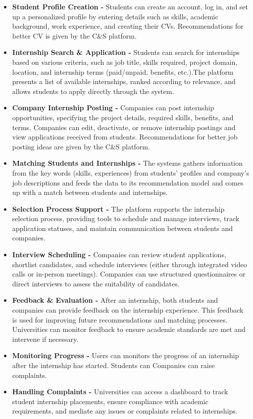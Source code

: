\begin{itemize}
    \item \textbf{Student Profile Creation - } Students can create an account, log in, and set up a personalized profile by entering details such as skills, academic background, work experience, and creating their CVs. Recommendations for better CV is given by the C\&S platform.
    \item \textbf{Internship Search \& Application - } Students can search for internships based on various criteria, such as job title, skills required, project domain, location, and internship terms (paid/unpaid, benefits, etc.).The platform presents a list of available internships, ranked according to relevance, and allows students to apply directly through the system.
    \item \textbf{Company Internship Posting - } Companies can post internship opportunities, specifying the project details, required skills, benefits, and terms. Companies can edit, deactivate, or remove internship postings and view applications received from students. Recommendations for better job posting ideas are given by the C\&S platform.
    \item \textbf{Matching Students and Internships - } The systems gathers information from the key words (skills, experiences) from students' profiles and company's job descriptions and feeds the data to its recommendation model and comes up with a match between students and internships. 
    \item \textbf{Selection Process Support - } The platform supports the internship selection process, providing tools to schedule and manage interviews, track application statuses, and maintain communication between students and companies.
    \item \textbf{Interview Scheduling - } Companies can review student applications, shortlist candidates, and schedule interviews (either through integrated video calls or in-person meetings). Companies can use structured questionnaires or direct interviews to assess the suitability of candidates.
    \item \textbf{Feedback \& Evaluation - } After an internship, both students and companies can provide feedback on the internship experience. This feedback is used for improving future recommendations and matching processes. Universities can monitor feedback to ensure academic standards are met and intervene if necessary.
    \item \textbf{Monitoring Progress - } Users can monitors the progress of an internship after the internship has started. Students can Companies can raise complaints.
    \item \textbf{Handling Complaints - } Universities can access a dashboard to track student internship placements, ensure compliance with academic requirements, and mediate any issues or complaints related to internships.

\end{itemize}

